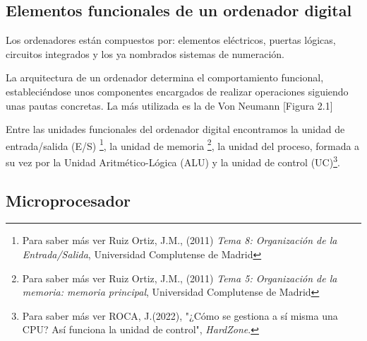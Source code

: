 \documentclass{book}
\begin{document}
\subsection {\textbf {Elementos funcionales de un ordenador digital}}

\begin{large}

    Los ordenadores están compuestos por: elementos eléctricos, puertas lógicas, circuitos integrados y los ya nombrados sistemas de numeración.

    La arquitectura de un ordenador determina el comportamiento funcional, estableciéndose unos componentes encargados de realizar operaciones siguiendo unas pautas concretas. La más utilizada es la de Von Neumann [Figura 2.1]

    Entre las unidades funcionales del ordenador digital encontramos la unidad de entrada/salida (E/S) \footnote {\normalsize Para saber más ver Ruiz Ortiz, J.M., (2011) \textit{Tema 8: Organización de la Entrada/Salida}, Universidad Complutense de Madrid}, la unidad de memoria \footnote {\normalsize Para saber más ver Ruiz Ortiz, J.M., (2011) \textit{Tema 5: Organización de la memoria: memoria principal}, Universidad Complutense de Madrid}, la unidad del proceso, formada a su vez por la Unidad Aritmético-Lógica (ALU) y la unidad de control (UC)\footnote {\normalsize Para saber más ver ROCA, J.(2022), "¿Cómo se gestiona a sí misma una CPU? Así funciona la unidad de control", \textit{HardZone}.}.

\end{large}

\subsection {\textbf {Microprocesador}}
\end{document}

